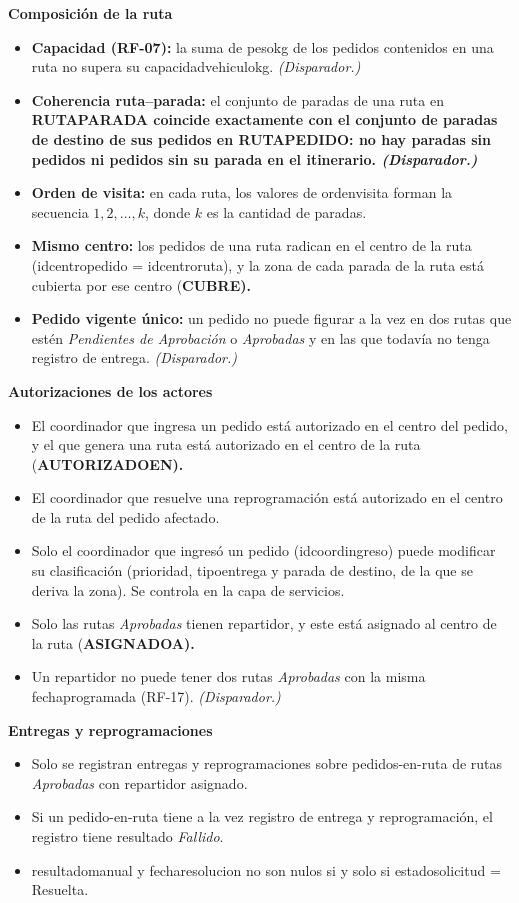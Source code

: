 \documentclass[11pt,a4paper]{article}
\newcommand{\ubrk}{\textunderscore\allowbreak}
\newcommand{\campo}[1]{\textnormal{\ttfamily\let\_\ubrk #1}}
\newcommand{\tabla}[1]{\begingroup\sffamily\bfseries\let\_\ubrk #1\endgroup}
\newcommand{\trig}{\textit{(Disparador.)}}
\begin{document}
\textbf{Composición de la ruta}
\begin{itemize}
\item \textbf{Capacidad (RF-07):} la suma de \campo{peso\_kg} de los pedidos contenidos en una ruta no supera su \campo{capacidad\_vehiculo\_kg}. \trig
\item \textbf{Coherencia ruta--parada:} el conjunto de paradas de una ruta en \tabla{RUTA\_PARADA} coincide exactamente con el conjunto de paradas de destino de sus pedidos en \tabla{RUTA\_PEDIDO}: no hay paradas sin pedidos ni pedidos sin su parada en el itinerario. \trig
\item \textbf{Orden de visita:} en cada ruta, los valores de \campo{orden\_visita} forman la secuencia $1, 2, \dots, k$, donde $k$ es la cantidad de paradas.
\item \textbf{Mismo centro:} los pedidos de una ruta radican en el centro de la ruta (\campo{id\_centro\_pedido} = \campo{id\_centro\_ruta}), y la zona de cada parada de la ruta está cubierta por ese centro (\tabla{CUBRE}).
\item \textbf{Pedido vigente único:} un pedido no puede figurar a la vez en dos rutas que estén \textit{Pendientes de Aprobación} o \textit{Aprobadas} y en las que todavía no tenga registro de entrega. \trig
\end{itemize}

\textbf{Autorizaciones de los actores}
\begin{itemize}
\item El coordinador que ingresa un pedido está autorizado en el centro del pedido, y el que genera una ruta está autorizado en el centro de la ruta (\tabla{AUTORIZADO\_EN}).
\item El coordinador que resuelve una reprogramación está autorizado en el centro de la ruta del pedido afectado.
\item Solo el coordinador que ingresó un pedido (\campo{id\_coord\_ingreso}) puede modificar su clasificación (\campo{prioridad}, \campo{tipo\_entrega} y parada de destino, de la que se deriva la zona). Se controla en la capa de servicios.
\item Solo las rutas \textit{Aprobadas} tienen repartidor, y este está asignado al centro de la ruta (\tabla{ASIGNADO\_A}).
\item Un repartidor no puede tener dos rutas \textit{Aprobadas} con la misma \campo{fecha\_programada} (RF-17). \trig
\end{itemize}

\textbf{Entregas y reprogramaciones}
\begin{itemize}
\item Solo se registran entregas y reprogramaciones sobre pedidos-en-ruta de rutas \textit{Aprobadas} con repartidor asignado.
\item Si un pedido-en-ruta tiene a la vez registro de entrega y reprogramación, el registro tiene resultado \textit{Fallido}.
\item \campo{resultado\_manual} y \campo{fecha\_resolucion} no son nulos si y solo si \campo{estado\_solicitud} = Resuelta.
\end{itemize}
\end{document}
